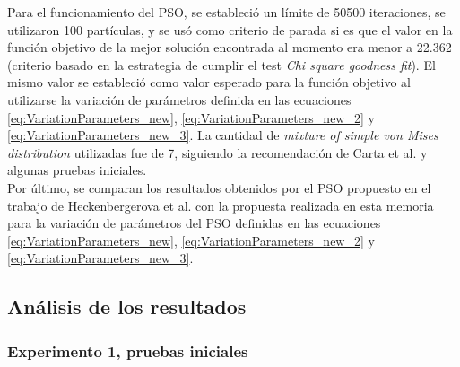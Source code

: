 Para el funcionamiento del PSO, se estableció un límite de 50500 iteraciones, se utilizaron 100 partículas, y se usó como criterio de parada si es que el valor en la función objetivo de la mejor solución encontrada al momento era menor a 22.362 (criterio basado en la estrategia de cumplir el test \emph{Chi square goodness fit}). El mismo valor se estableció como valor esperado para la función objetivo al utilizarse la variación de parámetros definida en las ecuaciones \ref{eq:VariationParameters_new},  \ref{eq:VariationParameters_new_2} y \ref{eq:VariationParameters_new_3}. La cantidad de \emph{mixture of simple von Mises distribution} utilizadas fue de 7, siguiendo la recomendación de Carta et al. \cite{Carta07} y algunas pruebas iniciales.\\

Por último, se comparan los resultados obtenidos por el PSO propuesto en el trabajo de Heckenbergerova et al. \cite{Heckenbergerova15} con la propuesta realizada en esta memoria para la variación de parámetros del PSO definidas en las ecuaciones \ref{eq:VariationParameters_new}, \ref{eq:VariationParameters_new_2} y \ref{eq:VariationParameters_new_3}.

\subsection{Análisis de los resultados}
\subsubsection{Experimento 1, pruebas iniciales}

